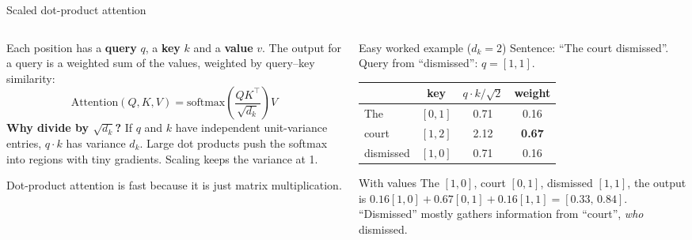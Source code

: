 \documentclass[aspectratio=169,11pt]{beamer}
\begin{document}
\begin{frame}{Scaled dot-product attention}
  \begin{columns}[T]
    \begin{column}{0.52\textwidth}
      \small
      Each position has a \textbf{query} $q$, a \textbf{key} $k$ and a \textbf{value} $v$. The output for a query is a weighted sum of the values, weighted by query--key similarity:
      \[
        \text{Attention}(Q,K,V)=\text{softmax}\!\left(\frac{QK^\top}{\sqrt{d_k}}\right)V
      \]
      \textbf{Why divide by $\sqrt{d_k}$?} If $q$ and $k$ have independent unit-variance entries, $q\cdot k$ has variance $d_k$. Large dot products push the softmax into regions with tiny gradients. Scaling keeps the variance at 1.
      \vspace{1mm}

      Dot-product attention is fast because it is just matrix multiplication.
    \end{column}
    \begin{column}{0.44\textwidth}
      \begin{exampleblock}{Easy worked example ($d_k=2$)}
        \small
        Sentence: ``The court dismissed''. Query from ``dismissed'': $q=[1,1]$.
        \vspace{1mm}

        \begin{tabular}{@{}lccc@{}}
          & key & $q\!\cdot\!k/\sqrt2$ & weight\\
          \midrule
          The & $[0,1]$ & 0.71 & 0.16\\
          court & $[1,2]$ & 2.12 & \textbf{0.67}\\
          dismissed & $[1,0]$ & 0.71 & 0.16\\
        \end{tabular}
        \vspace{1mm}

        With values The $[1,0]$, court $[0,1]$, dismissed $[1,1]$, the output is $0.16[1,0]+0.67[0,1]+0.16[1,1]=[0.33,\,0.84]$.
        ``Dismissed'' mostly gathers information from ``court'', \emph{who} dismissed.
      \end{exampleblock}
    \end{column}
  \end{columns}
\end{frame}
\end{document}
